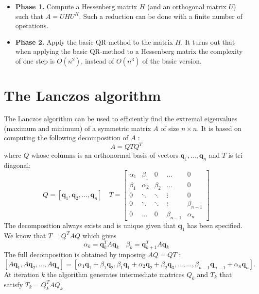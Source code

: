 \documentclass[11pt]{book}
\begin{document}
\begin{itemize}
  \item \textbf{Phase 1.} Compute a Hessenberg matrix $H$ (and an orthogonal matrix $U$) such that $A=U H U^{H}$. Such a reduction can be done with a finite number of operations.

  \item \textbf{Phase 2.} Apply the basic QR-method to the matrix $H$. It turns out that when applying the basic QR-method to a Hessenberg matrix the complexity of one step is $O\left(n^{2}\right)$, instead of $O\left(n^{3}\right)$ of the basic version.

\end{itemize}

\section*{The Lanczos algorithm}

The Lanczos algorithm can be used to efficiently find the extremal eigenvalues (maximum and minimum) of a symmetric matrix $A$ of size $n \times n$.
It is based on computing the following decomposition of $A$ :
$$
A=Q T Q^{T}
$$
where $Q$ whose columns is an orthonormal basis of vectors $\mathbf{q}_{1}, \ldots, \mathbf{q}_{n}$ and $T$ is tri-diagonal:
$$
Q=\left[\mathbf{q}_{1}, \mathbf{q}_{2}, \ldots, \mathbf{q}_{n}\right] \quad T=\left[\begin{array}{ccccc}
\alpha_{1} & \beta_{1} & 0 & \ldots & 0 \\
\beta_{1} & \alpha_{2} & \beta_{2} & \ldots & 0 \\
0 & \ddots & \ddots & \vdots & 0 \\
0 & \ddots & \ddots & \vdots & \beta_{n-1} \\
0 & \ldots & 0 & \beta_{n-1} & \alpha_{n}
\end{array}\right]
$$
The decomposition always exists and is unique given that $\mathbf{q}_{1}$ has been specified. We know that $T=Q^{T} A Q$ which gives
$$
\alpha_{k}=\mathbf{q}_{k}^{T} A \mathbf{q}_{k} \quad \beta_{k}=\mathbf{q}_{k+1}^{T} A \mathbf{q}_{k}
$$
The full decomposition is obtained by imposing $A Q=Q T$ :
$$\left[A \mathbf{q}_{1}, A \mathbf{q}_{2}, \ldots, A \mathbf{q}_{n}\right]=\left[\alpha_{1} \mathbf{q}_{1}+\beta_{1} \mathbf{q}_{2}, \beta_{1} \mathbf{q}_{1}+\alpha_{2} \mathbf{q}_{2}+\beta_{2} \mathbf{q}_{3}, \ldots, \ldots, \beta_{n-1} \mathbf{q}_{n-1}+\alpha_{n} \mathbf{q}_{n}\right].$$
At iteration $k$ the algorithm generates intermediate matrices $Q_{k}$ and $T_{k}$ that satisfy $T_{k}=Q_{k}^{T} A Q_{k}$
\end{document}

